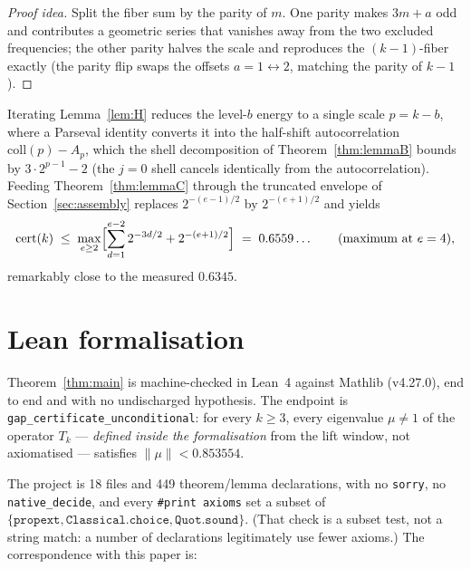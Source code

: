 \documentclass[12pt,a4paper]{article}
\newcommand{\cert}{\mathrm{cert}}
\begin{document}
\begin{proof}[Proof idea]
Split the fiber sum by the parity of $m$. One parity makes $3m + a$ odd and contributes a
geometric series that vanishes away from the two excluded frequencies; the other parity halves
the scale and reproduces the $(k-1)$-fiber exactly (the parity flip swaps the offsets
$a = 1 \leftrightarrow 2$, matching the parity of $k-1$).
\end{proof}

Iterating Lemma~\ref{lem:H} reduces the level-$b$ energy to a single scale $p = k - b$, where a
Parseval identity converts it into the half-shift autocorrelation $\mathrm{coll}(p) - A_p$, which
the shell decomposition of Theorem~\ref{thm:lemmaB} bounds by $3 \cdot 2^{p-1} - 2$ (the $j = 0$
shell cancels identically from the autocorrelation). Feeding Theorem~\ref{thm:lemmaC} through
the truncated envelope of Section~\ref{sec:assembly} replaces $2^{-(e-1)/2}$ by $2^{-(e+1)/2}$
and yields
\[
  \cert(k) \;\le\; \max_{e \ge 2}\Bigl[ \sum_{d=1}^{e-2} 2^{-3d/2} + 2^{-(e+1)/2} \Bigr]
  \;=\; 0.6559\ldots \qquad (\text{maximum at } e = 4),
\]
remarkably close to the measured $0.6345$.

\section{Lean formalisation}\label{sec:lean}

Theorem~\ref{thm:main} is machine-checked in Lean~4 against Mathlib (v4.27.0), end to end and
with no undischarged hypothesis. The endpoint is \texttt{gap\_certificate\_unconditional}: for
every $k \ge 3$, every eigenvalue $\mu \ne 1$ of the operator $T_k$ --- \emph{defined inside the
formalisation} from the lift window, not axiomatised --- satisfies $\|\mu\| < 0.853554$.

The project is 18 files and 449 theorem/lemma declarations, with no \texttt{sorry}, no
\texttt{native\_decide}, and every \texttt{\#print axioms} set a subset of
$\{\texttt{propext}, \texttt{Classical.choice}, \texttt{Quot.sound}\}$. (That check is a subset
test, not a string match: a number of declarations legitimately use fewer axioms.) The
correspondence with this paper is:
\end{document}
